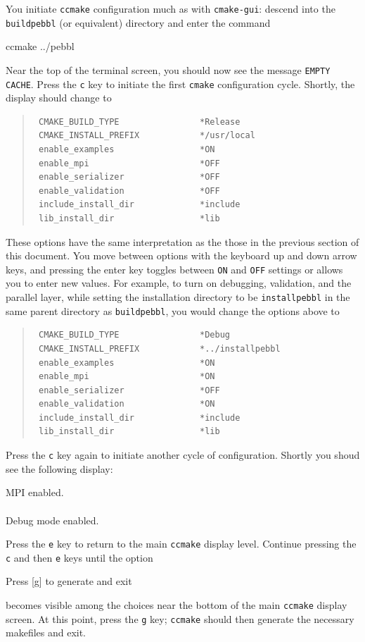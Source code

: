 You initiate \texttt{ccmake} configuration much as with \texttt{cmake-gui}:
descend into the \texttt{buildpebbl} (or equivalent) directory and enter the
command
\begin{codeblock}
ccmake ../pebbl
\end{codeblock}
Near the top of the terminal screen, you should now see the message
\texttt{EMPTY CACHE}.  Press the \texttt{c} key to initiate the first
\texttt{cmake} configuration cycle.  Shortly, the display should change to
\begin{quote}
\begin{verbatim}
 CMAKE_BUILD_TYPE                *Release
 CMAKE_INSTALL_PREFIX            */usr/local
 enable_examples                 *ON
 enable_mpi                      *OFF
 enable_serializer               *OFF
 enable_validation               *OFF
 include_install_dir             *include
 lib_install_dir                 *lib
\end{verbatim}
\end{quote}
These options have the same interpretation as the those in the previous
section of this document.  You move between options with the keyboard up and
down arrow keys, and pressing the enter key toggles between \texttt{ON} and
\texttt{OFF} settings or allows you to enter new values.  For example, to turn
on debugging, validation, and the parallel layer, while setting the
installation directory to be \texttt{installpebbl} in the same parent
directory as \texttt{buildpebbl}, you would change the options above to
\begin{quote}
\begin{verbatim}
 CMAKE_BUILD_TYPE                *Debug
 CMAKE_INSTALL_PREFIX            *../installpebbl
 enable_examples                 *ON
 enable_mpi                      *ON
 enable_serializer               *OFF
 enable_validation               *ON
 include_install_dir             *include
 lib_install_dir                 *lib
\end{verbatim}
\end{quote}
Press the \texttt{c} key again to initiate another cycle of configuration.
Shortly you shoud see the following display:
\begin{codeblock}
 MPI enabled. \\
\\
Debug mode enabled.
\end{codeblock}
Press the \texttt{e} key to return to the main \texttt{ccmake} display level.
Continue pressing the \texttt{c} and then \texttt{e} keys until the option
\begin{codeblock}
Press [g] to generate and exit
\end{codeblock}
becomes visible among the choices near the bottom of the main \texttt{ccmake}
display screen.  At this point, press the \texttt{g} key; \texttt{ccmake}
should then generate the necessary makefiles and exit.

